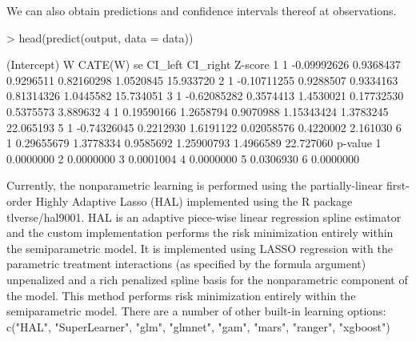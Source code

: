 \documentclass{article}
\begin{document}
We can also obtain predictions and confidence intervals thereof at observations.
\begin{Schunk}
\begin{Sinput}
> head(predict(output, data = data))
\end{Sinput}
\begin{Soutput}
  (Intercept)           W   CATE(W)        se    CI_left  CI_right   Z-score
1           1 -0.09992626 0.9368437 0.9296511 0.82160298 1.0520845 15.933720
2           1 -0.10711255 0.9288507 0.9334163 0.81314326 1.0445582 15.734051
3           1 -0.62085282 0.3574413 1.4530021 0.17732530 0.5375573  3.889632
4           1  0.19590166 1.2658794 0.9070988 1.15343424 1.3783245 22.065193
5           1 -0.74326045 0.2212930 1.6191122 0.02058576 0.4220002  2.161030
6           1  0.29655679 1.3778334 0.9585692 1.25900793 1.4966589 22.727060
    p-value
1 0.0000000
2 0.0000000
3 0.0001004
4 0.0000000
5 0.0306930
6 0.0000000
\end{Soutput}
\end{Schunk}

Currently, the nonparametric learning is performed using the partially-linear first-order Highly Adaptive Lasso (HAL) implemented using the R package tlverse/hal9001. HAL is an adaptive piece-wise linear regression spline estimator and the custom implementation performs the risk minimization entirely within the semiparametric model. It is implemented using LASSO regression with the parametric treatment interactions (as specified by the formula argument) unpenalized and a rich penalized spline basis for the nonparametric component of the model. This method performs risk minimization entirely within the semiparametric model. There are a number of other built-in learning options: c("HAL", "SuperLearner", "glm", "glmnet", "gam", "mars", "ranger", "xgboost")
\end{document}
